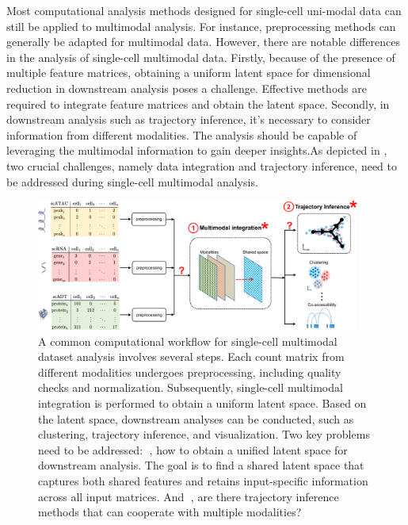 Most computational analysis methods designed for single-cell uni-modal data can still be applied to multimodal analysis. For instance, preprocessing methods can generally be adapted for multimodal data. However, there are notable differences in the analysis of single-cell multimodal data. Firstly, because of the presence of multiple feature matrices, obtaining a uniform latent space for dimensional reduction in downstream analysis poses a challenge. Effective methods are required to integrate feature matrices and obtain the latent space. Secondly, in downstream analysis such as trajectory inference, it's necessary to consider information from different modalities. The analysis should be capable of leveraging the multimodal information to gain deeper insights.As depicted in , two crucial challenges, namely data integration and trajectory inference, need to be addressed during single-cell multimodal analysis.

 
\begin{figure}[!ht]
	\centering
	\includegraphics[width=0.95\textwidth]{workflow_multimodal/fig}
	\vspace{0.1cm}
	\caption[A common computational multimodal analysis workflow.]{A common computational workflow for single-cell multimodal dataset analysis involves several steps. Each count matrix from different modalities undergoes preprocessing, including quality checks and normalization. Subsequently, single-cell multimodal integration is performed to obtain a uniform latent space. Based on the latent space, downstream analyses can be conducted, such as clustering, trajectory inference, and visualization. Two key problems need to be addressed: \textcircled{}, how to obtain a unified latent space for downstream analysis. The goal is to find a shared latent space that captures both shared features and retains input-specific information across all input matrices. And \textcircled{}, are there trajectory inference methods that can cooperate with multiple modalities?}
	\label{fig:workflow_multimodal}
\end{figure}

